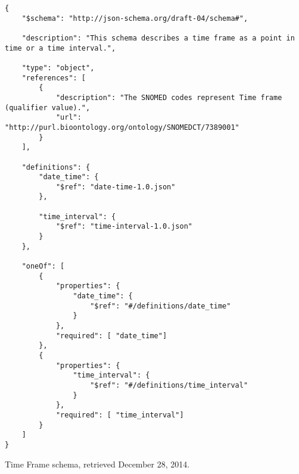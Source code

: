 \begin{listing}
\begin{verbatim}
{
    "$schema": "http://json-schema.org/draft-04/schema#",

    "description": "This schema describes a time frame as a point in time or a time interval.",

    "type": "object",
    "references": [
        {
            "description": "The SNOMED codes represent Time frame (qualifier value).",
            "url": "http://purl.bioontology.org/ontology/SNOMEDCT/7389001"
        }
    ],

    "definitions": {
        "date_time": {
            "$ref": "date-time-1.0.json"
        },

        "time_interval": {
            "$ref": "time-interval-1.0.json"
        }
    },

    "oneOf": [
        {
            "properties": {
                "date_time": {
                    "$ref": "#/definitions/date_time"
                }
            },
            "required": [ "date_time"]
        },
        {
            "properties": {
                "time_interval": {
                    "$ref": "#/definitions/time_interval"
                }
            },
            "required": [ "time_interval"]
        }
    ]
}
\end{verbatim}
\caption{Time Frame schema, retrieved December 28, 2014.} 
\label{listing:time-frame-json}
\end{listing}
    

